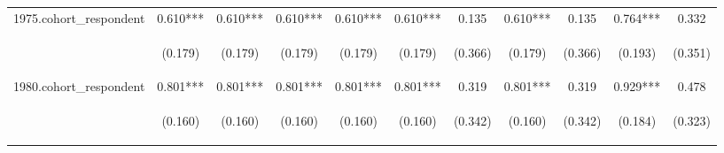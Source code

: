 \begin{center}
\begin{tabular}{lcccccccccc}
1975.cohort\_respondent & 0.610*** & 0.610*** & 0.610*** & 0.610*** & 0.610*** & 0.135 & 0.610*** & 0.135 & 0.764*** & 0.332 \\
\vspace{4pt} & \begin{footnotesize}(0.179)\end{footnotesize} & \begin{footnotesize}(0.179)\end{footnotesize} & \begin{footnotesize}(0.179)\end{footnotesize} & \begin{footnotesize}(0.179)\end{footnotesize} & \begin{footnotesize}(0.179)\end{footnotesize} & \begin{footnotesize}(0.366)\end{footnotesize} & \begin{footnotesize}(0.179)\end{footnotesize} & \begin{footnotesize}(0.366)\end{footnotesize} & \begin{footnotesize}(0.193)\end{footnotesize} & \begin{footnotesize}(0.351)\end{footnotesize} \\
1980.cohort\_respondent & 0.801*** & 0.801*** & 0.801*** & 0.801*** & 0.801*** & 0.319 & 0.801*** & 0.319 & 0.929*** & 0.478 \\
\vspace{4pt} & \begin{footnotesize}(0.160)\end{footnotesize} & \begin{footnotesize}(0.160)\end{footnotesize} & \begin{footnotesize}(0.160)\end{footnotesize} & \begin{footnotesize}(0.160)\end{footnotesize} & \begin{footnotesize}(0.160)\end{footnotesize} & \begin{footnotesize}(0.342)\end{footnotesize} & \begin{footnotesize}(0.160)\end{footnotesize} & \begin{footnotesize}(0.342)\end{footnotesize} & \begin{footnotesize}(0.184)\end{footnotesize} & \begin{footnotesize}(0.323)\end{footnotesize} \\

\end{tabular}
\end{center}
